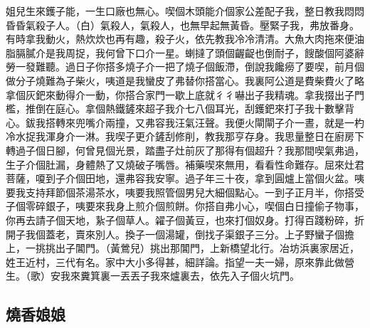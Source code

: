 姐兒生來鑊子能，一生口廠也無心。喫個木頭能介個家公差配子我，整日教我悶悶昏昏氣殺子人。（白）氣殺人，氣殺人，也無早起無黃昏。壓緊子我，弗放番身。有時拿我動火，熱炊炊也再有趣，殺子火，依先教我冷冷清清。大魚大肉拖來便油脂膈膩介是我周捉，我何曾下口介一星。蝲撻了頭個齷齪也倒耐子，餿酸個阿婆辭勞一發難聽。過日子你搭多燒子介一把了燒子個飯滯，倒說我饞癆了要喫，前月個做分子燒難為子柴火，咦道是我蠻皮了弗替你搭當心。我裏阿公道是費柴費火了略拿個灰鈀來動得介一動，你搭合家門一歇上底就彳彳嚇出子我精魂。拿我掇出子門檻，推倒在庭心。拿個熱鐵鏟來超子我介七八個耳光，刮鑊鈀來打子我十數擊背心。鈸我搭轉來兜嘴介兩撞，又弗容我汪氣汪聲。我便火閘閘子介一晝，就是一杓冷水捉我渾身介一淋。我喫子更介鏟刮修削，教我那亨存身。我思量整日在廚房下轉過子個日腳，何曾見個光景，踏盡子灶前灰了那得有個超升？我那間喫氣弗過，生子介個肚漏，身體熱了又燒破子嘴唇。補藥喫來無用，看看性命難存。屈來灶君菩薩，嗄到子介個田地，還弗容我安寧。過子年三十夜，拿到圓爐上當個火盆。咦要我支持拜節個茶湯茶水，咦要我照管個男兒大細個點心。一到子正月半，你搭受子個零碎銀子，咦要來我身上煎介個煎餅。你搭自弗小心，喫個白日撞偷子物事，你再去請子個天地，紥子個草人。糴子個黃豆，也來打個奴身。打得百踐粉碎，折開子我個蓋老，賣來別人。換子一個湯罐，倒找子渠銀子三分。上子野蠻子個擔上，一挑挑出子閶門。（黃鶯兒）挑出那閶門，上新橋望北行。冶坊浜裏家居近，姓王近村，三代有名。家中大小多得甚，細詳論。指望一夫一婦，原來靠此做營生。（歌）安我來糞箕裏一丟丟子我來爐裏去，依先入子個火坑門。

\subsection*{燒香娘娘}

